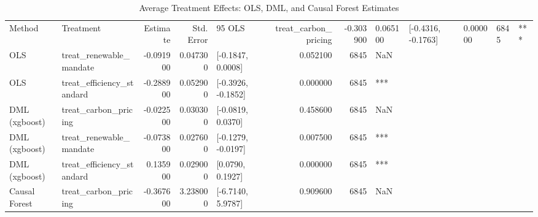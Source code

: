 \begin{table}
\caption{Average Treatment Effects: OLS, DML, and Causal Forest Estimates}
\label{tab:main_results}
\begin{tabular}{llrrlrrl}
\toprule
Method & Treatment & Estimate & Std. Error & 95%
\midrule
OLS & treat_carbon_pricing & -0.303900 & 0.065100 & [-0.4316, -0.1763] & 0.000000 & 6845 & *** \\
OLS & treat_renewable_mandate & -0.091900 & 0.047300 & [-0.1847, 0.0008] & 0.052100 & 6845 & NaN \\
OLS & treat_efficiency_standard & -0.288900 & 0.052900 & [-0.3926, -0.1852] & 0.000000 & 6845 & *** \\
DML (xgboost) & treat_carbon_pricing & -0.022500 & 0.030300 & [-0.0819, 0.0370] & 0.458600 & 6845 & NaN \\
DML (xgboost) & treat_renewable_mandate & -0.073800 & 0.027600 & [-0.1279, -0.0197] & 0.007500 & 6845 & *** \\
DML (xgboost) & treat_efficiency_standard & 0.135900 & 0.029000 & [0.0790, 0.1927] & 0.000000 & 6845 & *** \\
Causal Forest & treat_carbon_pricing & -0.367600 & 3.238000 & [-6.7140, 5.9787] & 0.909600 & 6845 & NaN \\
\bottomrule
\end{tabular}
\end{table}
